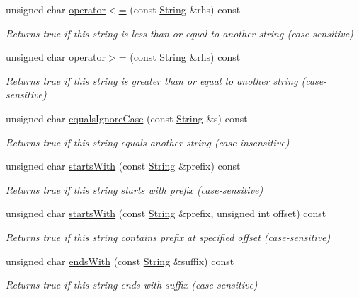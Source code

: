 \begin{DoxyCompactItemize}
unsigned char \hyperlink{class_string_a111fa1bc3ab1c20223cc8940cd122278}{operator$<$=} (const \hyperlink{class_string}{String} \&rhs) const
\begin{DoxyCompactList}\small\item\em Returns true if this string is less than or equal to another string (case-\/sensitive) \end{DoxyCompactList}\item 
unsigned char \hyperlink{class_string_ad55ec344221bba8a7447226bde7b00dc}{operator$>$=} (const \hyperlink{class_string}{String} \&rhs) const
\begin{DoxyCompactList}\small\item\em Returns true if this string is greater than or equal to another string (case-\/sensitive) \end{DoxyCompactList}\item 
unsigned char \hyperlink{class_string_a3b8832687edda189ae43632d70157b94}{equals\+Ignore\+Case} (const \hyperlink{class_string}{String} \&s) const
\begin{DoxyCompactList}\small\item\em Returns true if this string equals another string (case-\/insensitive) \end{DoxyCompactList}\item 
unsigned char \hyperlink{class_string_aa63267cdf821b619ffb0a103510ae6ff}{starts\+With} (const \hyperlink{class_string}{String} \&prefix) const
\begin{DoxyCompactList}\small\item\em Returns true if this string starts with prefix (case-\/sensitive) \end{DoxyCompactList}\item 
unsigned char \hyperlink{class_string_a2ea4d98b45263f59c9eb1f842b04b3af}{starts\+With} (const \hyperlink{class_string}{String} \&prefix, unsigned int offset) const
\begin{DoxyCompactList}\small\item\em Returns true if this string contains prefix at specified offset (case-\/sensitive) \end{DoxyCompactList}\item 
unsigned char \hyperlink{class_string_af96a205cd68121b2fbdf01f5e9b9bb31}{ends\+With} (const \hyperlink{class_string}{String} \&suffix) const
\begin{DoxyCompactList}\small\item\em Returns true if this string ends with suffix (case-\/sensitive) \end{DoxyCompactList}\item 

\end{DoxyCompactItemize}
